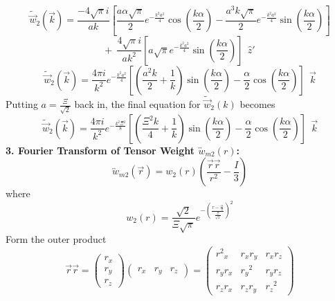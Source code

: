 \documentclass[12pt]{article}
\begin{document}
\begin{equation}{\widetilde{\vec{w}}_2(\vec{k})=\frac{-4\sqrt{\pi}i}{ak}\left[\frac{a\alpha\sqrt{\pi}}{2}e^{-\frac{k^2a^2}{4}}\cos\left(\frac{k\alpha}{2}\right)-\frac{a^3k\sqrt{\pi}}{2}e^{-\frac{k^2a^2}{4}}\sin\left(\frac{k\alpha}{2}\right)\right]}\end{equation} 
\begin{displaymath}{+{~~}\frac{4\sqrt{\pi}i}{ak^2}\left[a\sqrt{\pi}e^{-\frac{k^2a^2}{4}}\sin\left(\frac{k\alpha}{2}\right)\right]{~~}\hat{z}'}\end{displaymath}
\[{}\]
\begin{equation}{\widetilde{\vec{w}}_2(\vec{k})=\frac{4\pi{i}}{k^2}e^{-\frac{k^2a^2}{4}}\left[\left(\frac{a^2k}{2}+\frac{1}{k}\right)\sin\left(\frac{k\alpha}{2}\right)-\frac{\alpha}{2}\cos\left(\frac{k\alpha}{2}\right)\right]{~~}\vec{k}}\end{equation} 
Putting $a=\frac{\Xi}{\sqrt{2}}$ back in, the final equation for $\widetilde{\vec{w}}_2(k)$ becomes
\begin{equation}{\widetilde{\vec{w}}_2(\vec{k})=\frac{4\pi{i}}{k^2}e^{-\frac{k^2\Xi^2}{8}}\left[\left(\frac{\Xi^2k}{4}+\frac{1}{k}\right)\sin\left(\frac{k\alpha}{2}\right)-\frac{\alpha}{2}\cos\left(\frac{k\alpha}{2}\right)\right]{~~}\vec{k}}\end{equation} 
\[{}\]
\textbf{3. Fourier Transform of Tensor Weight $\overleftrightarrow{w}_{m2}(r)$:}
\begin{equation}{\overleftrightarrow{w}_{m2}(\vec{r})=w_2(r)\left(\frac{\vec{r}\vec{r}}{r^2}-\frac{I}{3}\right)}\end{equation}
where
\begin{equation}{w_2(r)=\frac{\sqrt{2}}{\Xi\sqrt{\pi}}e^{-\left(\frac{r-\frac{\alpha}{2}}{\frac{\Xi}{\sqrt{2}}}\right)^2}}\end{equation}
Form the outer product
\begin{equation}{\vec{r}\vec{r}=\left(\begin{array}{c} r_x \\ r_y \\ r_z \end{array} \right) \left(\begin{array}{rrr} r_x & r_y & r_z \end{array} \right)=\left(\begin{array}{ccc} {r^2}_x & r_xr_y & r_xr_z \\ r_yr_x & {r_y}^2 & r_yr_z \\ r_zr_x & r_zr_y & {r_z}^2 \end{array}\right)}\end{equation}
\end{document}
